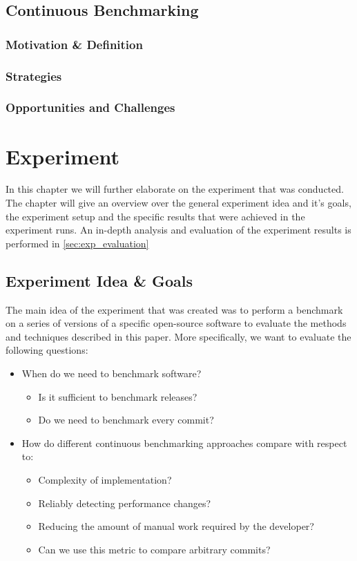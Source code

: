 \documentclass[	runningheads,
				a4paper]{llncs}
\begin{document}
	\subsection{Continuous Benchmarking}

	\subsubsection{Motivation \& Definition}
		\subsubsection{Strategies}
		\subsubsection{Opportunities and Challenges}


\section{Experiment}
In this chapter we will further elaborate on the experiment that was conducted. The chapter will give an overview over the general experiment idea and it's goals, the experiment setup and the specific results that were achieved in the experiment runs. An in-depth analysis and evaluation of the experiment results is performed in \autoref{sec:exp_evaluation}

	\subsection{Experiment Idea \& Goals}
	\label{ssec:exp_goals}

	The main idea of the experiment that was created was to perform a benchmark on a series of versions of a specific open-source software to evaluate the methods and techniques described in this paper. More specifically, we want to evaluate the following questions:
	\begin{itemize}
		\item When do we need to benchmark software?
			\begin{itemize}
				\item Is it sufficient to benchmark releases?
				\item Do we need to benchmark every commit?
			\end{itemize}
		\item How do different continuous benchmarking approaches compare with respect to:
			\begin{itemize}
				\item Complexity of implementation?
				\item Reliably detecting performance changes?
				\item Reducing the amount of manual work required by the developer?
				\item Can we use this metric to compare arbitrary commits?
			\end{itemize}
	\end{itemize}
\end{document}
